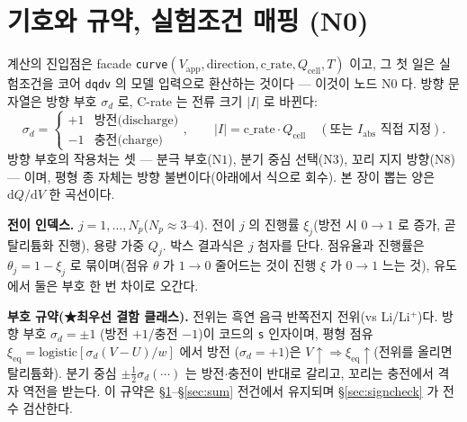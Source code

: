 \documentclass[11pt,a4paper]{article}
\newcommand{\dd}{\mathrm{d}}
\newcommand{\eq}{\mathrm{eq}}
\newcommand{\app}{\mathrm{app}}
\newcommand{\cell}{\mathrm{cell}}
\newcommand{\code}[1]{\texttt{#1}}
\begin{document}
\tableofcontents
\newpage

\section{기호와 규약, 실험조건 매핑 (N0)}\label{sec:notation}
계산의 진입점은 facade \code{curve}$(V_\app,\text{direction},\text{c\_rate},Q_\cell,T)$ 이고, 그 첫 일은 실험조건을
코어 \code{dqdv} 의 모델 입력으로 환산하는 것이다 — 이것이 노드 $\mathrm N0$ 다. 방향 문자열은 방향 부호 $\sigma_d$ 로,
C-rate 는 전류 크기 $|I|$ 로 바뀐다:
\begin{equation}
\sigma_d=\begin{cases}+1 & \text{방전(discharge)}\\ -1 & \text{충전(charge)}\end{cases},
\qquad
|I|=\text{c\_rate}\cdot Q_\cell\quad(\text{또는 }I_\mathrm{abs}\text{ 직접 지정}).
\label{eq:n0map}
\end{equation}
방향 부호의 작용처는 셋 — 분극 부호($\mathrm N1$), 분기 중심 선택($\mathrm N3$), 꼬리 지지 방향($\mathrm N8$) — 이며,
평형 종 자체는 방향 불변이다(아래에서 식으로 회수). 본 장이 뽑는 양은 $\dd Q/\dd V$ 한 곡선이다.

\textbf{전이 인덱스.} $j=1,\dots,N_p$($N_p\approx3$--$4$). 전이 $j$ 의 진행률 $\xi_j$(방전 시 $0\to1$ 로 증가, 곧 탈리튬화 진행),
용량 가중 $Q_j$. 박스 결과식은 $j$ 첨자를 단다. 점유율과 진행률은 $\theta_j=1-\xi_j$ 로 묶이며(점유 $\theta$ 가 $1\to0$
줄어드는 것이 진행 $\xi$ 가 $0\to1$ 느는 것), 유도에서 둘은 부호 한 번 차이로 오간다.

\textbf{부호 규약(★최우선 결함 클래스).} 전위는 흑연 음극 반쪽전지 전위(vs Li/Li$^+$)다. 방향 부호 $\sigma_d=\pm1$
(방전 $+1$/충전 $-1$)이 코드의 \code{s} 인자이며, 평형 점유 $\xi_\eq=\mathrm{logistic}[\sigma_d(V-U)/w]$ 에서 방전
($\sigma_d=+1$)은 $V\!\uparrow\Rightarrow\xi_\eq\!\uparrow$(전위를 올리면 탈리튬화). 분기 중심 $\pm\tfrac12\sigma_d(\cdots)$
는 방전$\cdot$충전이 반대로 갈리고, 꼬리는 충전에서 격자 역전을 받는다. 이 규약은 \S\ref{sec:notation}--\S\ref{sec:sum}
전건에서 유지되며 \S\ref{sec:signcheck} 가 전수 검산한다.
\end{document}
